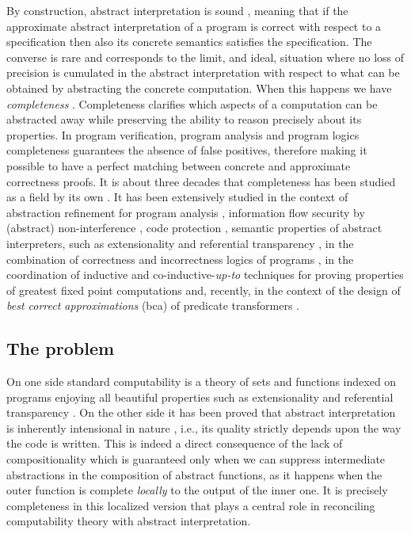 \documentclass[runningheads]{llncs}
\begin{document}
By construction, abstract interpretation is sound \cite{CC77}, meaning that if the approximate abstract interpretation of a program is correct with respect to a specification then also its concrete semantics satisfies the specification.
The converse is rare and corresponds to the limit, and ideal, situation where no loss of precision is cumulated in the abstract interpretation with respect to what can be obtained by abstracting the concrete computation. When this happens we have {\em completeness} \cite{CC79,GRS00}. 
%
Completeness clarifies which aspects of a computation can be abstracted away while preserving the ability to reason precisely about its properties.
In program verification, program analysis and program logics completeness guarantees the absence of false positives, therefore making it possible to have a perfect matching between concrete and approximate correctness proofs. It is about three decades that completeness has been studied as a field by its own \cite{GR97b}. 
It has been extensively studied in the context of abstraction refinement for program analysis \cite{GRS00,GQ01,BruniGGR22}, information flow security by (abstract) non-interference \cite{GMadj10}, code protection \cite{G08}, semantic properties of abstract interpreters, such as extensionality and referential transparency \cite{BruniGGGP20}, in the combination of correctness and incorrectness logics of programs \cite{BruniGGR21,BruniGGR23}, in the coordination of inductive and co-inductive-{\em up-to\/} techniques for proving properties of greatest fixed point computations \cite{BGGP18} and, recently, in the context of the design of {\em best correct approximations} (bca) of predicate transformers \cite{GiacobazziR25}.

\subsection{The problem}
On one side standard computability is a theory of sets and functions indexed on programs enjoying all beautiful properties such as extensionality and referential transparency \cite{odifreddi}. On the other side 
it has been proved that abstract interpretation is inherently intensional in nature \cite{BruniGGGP20}, i.e., its quality strictly depends upon the way the code is written. This is indeed a direct consequence of the lack of compositionality \cite{GiacobazziR25} which is guaranteed only when we can suppress intermediate abstractions in the composition of abstract functions, as it happens when the outer function is complete {\em locally\/} to the output of the inner one. It is precisely completeness in this localized version that plays a central role in reconciling computability theory with abstract interpretation. 
\end{document}
